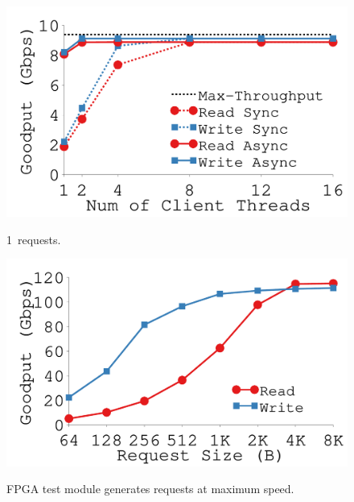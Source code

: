{
\begin{figure}[th]
\begin{minipage}{\figWidthSix}
\begin{center}
\centerline{\includegraphics[width=\columnwidth]{Figures/g_plot_throughput.pdf}}
\vspace{-0.1in}
\captionsetup{width=.9\columnwidth}
{
1\KB\ requests. %
}
\end{center}
\end{minipage}
\begin{minipage}{\figWidthSix}
\begin{center}
\centerline{\includegraphics[width=\columnwidth]{Figures/g_plot_onboard_throughput.pdf}}
\vspace{-0.1in}
\captionsetup{width=.9\columnwidth}
{
FPGA test module generates requests at maximum speed.
}
\end{center}
\end{minipage}

\end{figure}}
